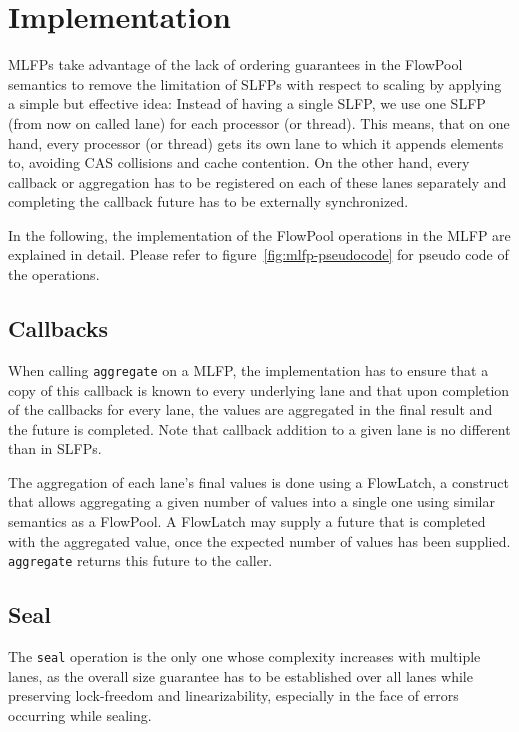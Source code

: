 \documentclass[runningheads,a4paper,fleqn]{llncs}
\begin{document}
\section{Implementation}
MLFPs take advantage of the lack of ordering guarantees in the
FlowPool semantics to remove the limitation of SLFPs with respect to
scaling by applying a simple but effective idea: Instead of having a
single SLFP, we use one SLFP (from now on called lane) for each
processor (or thread). This means, that on one hand, every processor
(or thread) gets its own lane to which it appends elements to,
avoiding CAS collisions and cache contention. On the other hand, every
callback or aggregation has to be registered on each of these lanes
separately and completing the callback future has to be externally
synchronized.

In the following, the implementation of the FlowPool operations in the
MLFP are explained in detail. Please refer to
figure~\ref{fig:mlfp-pseudocode} for pseudo code of the operations.

\subsection{Callbacks}
When calling \verb+aggregate+ on a MLFP, the implementation has to
ensure that a copy of this callback is known to every underlying lane
and that upon completion of the callbacks for every lane, the values
are aggregated in the final result and the future is completed. Note
that callback addition to a given lane is no different than in SLFPs.

The aggregation of each lane's final values is done using a FlowLatch,
a construct that allows aggregating a given number of values into a
single one using similar semantics as a FlowPool. A FlowLatch may
supply a future that is completed with the aggregated value, once the
expected number of values has been supplied. \verb+aggregate+ returns
this future to the caller.

\subsection{Seal}
The \verb+seal+ operation is the only one whose complexity increases
with multiple lanes, as the overall size guarantee has to be
established over all lanes while preserving lock-freedom and
linearizability, especially in the face of errors occurring while
sealing.
\end{document}
